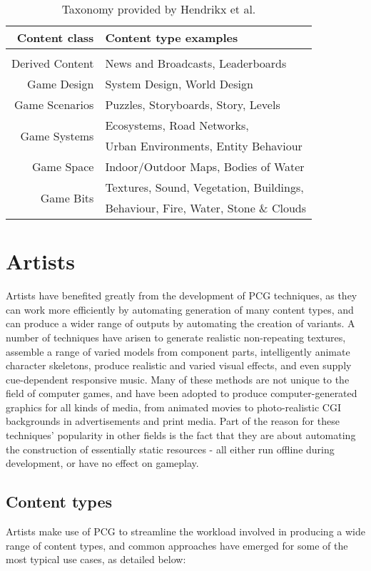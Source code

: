 \documentclass{acm_proc_article-sp}
\begin{document}
\begin{table}[!ht]
  \begin{tabular}{r|l}
  Content class		& Content type examples\\
  \hline 
   \\[-2ex]
  Derived Content	& News and Broadcasts, Leaderboards\\ [.5ex]
  Game Design		& System Design, World Design\\ [.5ex]
  Game Scenarios	& Puzzles, Storyboards, Story, Levels\\ [.5ex]
  \multirow{2}{*}{Game Systems}
  					& Ecosystems, Road Networks,\\
  					& Urban Environments, Entity Behaviour\\ [.5ex]
  Game Space		& Indoor/Outdoor Maps, Bodies of Water\\ [.5ex]
  \multirow{2}{*}{Game Bits}
  					& Textures, Sound, Vegetation, Buildings,\\
  					& Behaviour, Fire, Water, Stone \& Clouds\\ [-2ex]
  \end{tabular}
  \caption{Taxonomy provided by Hendrikx et al. \cite{hendrikx2012procedural}}
  \label{tab:hendrikx}
\end{table}

\section{Artists}
Artists have benefited greatly from the development of PCG techniques, as they can work more efficiently by automating generation of many content types, and can produce a wider range of outputs by automating the creation of variants. A number of techniques have arisen to generate realistic non-repeating textures, assemble a range of varied models from component parts, intelligently animate character skeletons, produce realistic and varied visual effects, and even supply cue-dependent responsive music. Many of these methods are not unique to the field of computer games, and have been adopted to produce computer-generated graphics for all kinds of media, from animated movies to photo-realistic CGI backgrounds in advertisements and print media. Part of the reason for these techniques' popularity in other fields is the fact that they are about automating the construction of essentially static resources - all either run offline during development, or have no effect on gameplay. 

\subsection{Content types}
Artists make use of PCG to streamline the workload involved in producing a wide range of content types, and common approaches have emerged for some of the most typical use cases, as detailed below:
\end{document}
